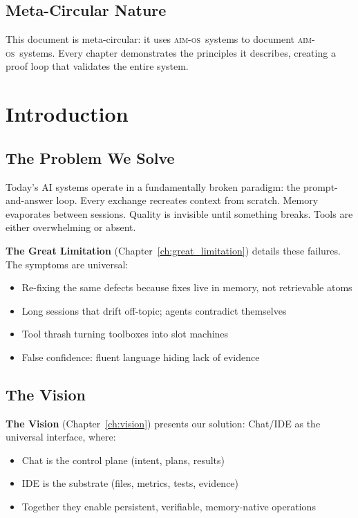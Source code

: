 \documentclass[11pt,a4paper,twoside]{book}
\newcommand{\aimos}{\textsc{aim-os}}
\theoremstyle{definition}
\theoremstyle{remark}
\begin{document}
\section*{Meta-Circular Nature}

This document is meta-circular: it uses \aimos\ systems to document \aimos\ systems. Every chapter demonstrates the principles it describes, creating a proof loop that validates the entire system.

\chapter*{Introduction}

\section*{The Problem We Solve}

Today's AI systems operate in a fundamentally broken paradigm: the prompt-and-answer loop. Every exchange recreates context from scratch. Memory evaporates between sessions. Quality is invisible until something breaks. Tools are either overwhelming or absent.

\textbf{The Great Limitation} (Chapter~\ref{ch:great_limitation}) details these failures. The symptoms are universal:
\begin{itemize}
    \item Re-fixing the same defects because fixes live in memory, not retrievable atoms
    \item Long sessions that drift off-topic; agents contradict themselves
    \item Tool thrash turning toolboxes into slot machines
    \item False confidence: fluent language hiding lack of evidence
\end{itemize}

\section*{The Vision}

\textbf{The Vision} (Chapter~\ref{ch:vision}) presents our solution: Chat/IDE as the universal interface, where:
\begin{itemize}
    \item Chat is the control plane (intent, plans, results)
    \item IDE is the substrate (files, metrics, tests, evidence)
    \item Together they enable persistent, verifiable, memory-native operations
\end{itemize}
\end{document}
